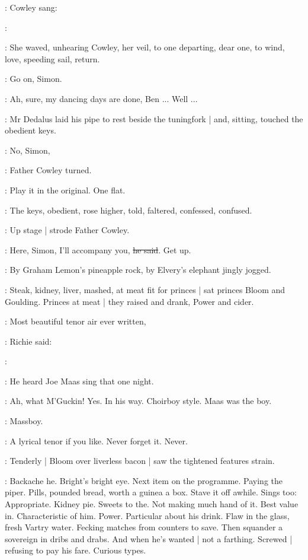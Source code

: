 :
Cowley sang:

\cowley:

:
She waved,
unhearing Cowley,
her veil,
to one departing,
dear one,
to wind,
love,
speeding sail,
return.

\dollard:
Go on,
Simon.

\simon:
Ah,
sure,
my dancing days are done,
Ben ...
Well ...

:
Mr Dedalus laid his pipe to rest beside the tuningfork |
and,
sitting,
touched the obedient keys.

\cowley:
No,
Simon,

:
Father Cowley turned.

\cowley:
Play it in the original.
One flat.

:
The keys,
obedient,
rose higher,
told,
faltered,
confessed,
confused.

:
Up stage |
strode Father Cowley.

\cowley:
Here,
Simon,
I'll accompany you,
\sout{he said}.
Get up.

:
By Graham Lemon's pineapple rock,
by Elvery's elephant
jingly jogged.

:
Steak,
kidney,
liver,
mashed,
at meat fit for princes |
sat princes Bloom and Goulding.
Princes at meat |
they raised and drank,
Power and cider.

\goulding:
Most beautiful tenor air ever written,

:
Richie said:

\goulding:

:
He heard Joe Maas sing that one night.

\goulding:
Ah,
what M'Guckin!
Yes.
In his way.
Choirboy style.
Maas was the boy.

\BloomInt:
Massboy.

\goulding:
A lyrical tenor if you like.
Never forget it.
Never.

:
Tenderly |
Bloom over liverless bacon |
saw the tightened features strain.

\BloomInt:
Backache he.
Bright's bright eye.
Next item on the programme.
Paying the piper.
Pills,
pounded bread,
worth a guinea a box.
Stave it off awhile.
Sings too:
Appropriate.
Kidney pie.
Sweets to the.
Not making much hand of it.
Best value in.
Characteristic of him.
Power.
Particular about his drink.
Flaw in the glass,
fresh Vartry water.
Fecking matches from counters to save.
Then squander a sovereign
in dribs and drabs.
And when he's wanted |
not a farthing.
Screwed |
refusing to pay his fare.
Curious types.

